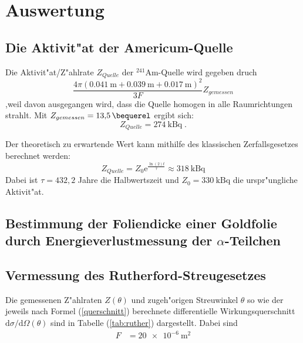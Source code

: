 \section{Auswertung}
\label{sec:Auswertung}

\subsection{Die Aktivit"at der Americum-Quelle}
  Die Aktivit"at/Z"ahlrate $Z_{Quelle}$ der $^{241}\text{Am}$-Quelle wird gegeben druch
  \begin{equation}
    \frac{4\pi(\SI{0,041}{\meter}+\SI{0,039}{\meter}+\SI{0.017}{\meter})^2}{3F}Z_{gemessen}
  \end{equation}
  ,weil davon ausgegangen wird, dass die Quelle homogen in alle Raumrichtungen strahlt.
  Mit $Z_{gemessen}=\SI{13,5}{\bequerel}$ ergibt sich:
  \begin{equation}
    Z_{Quelle} = \SI{274}{\kilo \becquerel} \; .
  \end{equation}

  Der theoretisch zu erwartende Wert kann mithilfe des klassischen Zerfallsgesetzes berechnet werden:
  \begin{equation}
    Z_{Quelle} = Z_0\text{e}^{\frac{\ln(2)t}{\tau}} \approx \SI{318}{\kilo \becquerel}
  \end{equation}
  Dabei ist $\tau=432,2$ Jahre die Halbwertszeit und $Z_0=\SI{330}{\kilo \becquerel}$ \cite{Anleitung} die urspr"ungliche Aktivit"at.


\subsection{\texorpdfstring{Bestimmung der Foliendicke einer Goldfolie durch Energieverlustmessung der $\alpha$-Teilchen}{Bestimmung der Foliendicke einer Goldfolie durch Energieverlustmessung der alpha-Teilchen}}





\subsection{Vermessung des Rutherford-Streugesetzes}
  Die gemessenen Z"ahlraten $Z(\theta)$ und zugeh"origen Streuwinkel $\theta$ so wie der jeweils nach Formel (\ref{querschnitt}) berechnete differentielle Wirkungsquerschnitt $\text{d}\sigma/\text{d}\Omega(\theta)$ sind in Tabelle (\ref{tab:ruther}) dargestellt.
  Dabei sind
  \begin{align*}
    F &= \SI{20e-6}{\meter \squared} \\
  \end{align*}


